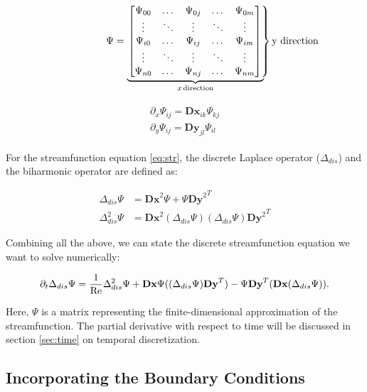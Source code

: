 \begin{align}
\Psi = 
\underbrace{
\left.
\begin{bmatrix}
  \Psi_{00} & \dots  & \Psi_{0j} & \dots  & \Psi_{0m} \\
  \vdots & \ddots & \vdots & \ddots & \vdots \\
  \Psi_{i0} & \dots  & \Psi_{ij} & \dots  & \Psi_{im} \\
  \vdots & \ddots & \vdots & \ddots & \vdots \\
  \Psi_{n0} & \dots  & \Psi_{nj} & \dots  & \Psi_{nm} \\
\end{bmatrix}
\right\} \text{y direction}
\hspace*{-55pt}}_{x \, \text{direction}}
\label{eq:str_matrix}
\end{align}

\begin{align}
  \begin{split}
  \partial_x \Psi_{ij} = \mathbf{Dx}_{ik} \Psi_{kj} \\
  \partial_y \Psi_{ij} = \mathbf{Dy}_{jl} \Psi_{il}
  \end{split}
\label{eq:discr_der}
\end{align}

For the streamfunction equation \eqref{eq:str}, the discrete Laplace operator
($\Delta_{dis}$) and the biharmonic operator are defined as:

\begin{align}
  \Delta_{dis} \Psi &= \mathbf{Dx}^2\Psi + \Psi{\mathbf{Dy}^2}^T \\
  \Delta_{dis}^2 \Psi &= \mathbf{Dx}^2(\Delta_{dis} \Psi) (\Delta_{dis}
    \Psi){\mathbf{Dy}^2}^T 
\end{align}

Combining all the above, we can state the discrete streamfunction equation we
want to solve numerically:

\begin{align}
\partial_t \Delta_{dis} \Psi = \frac{1}{\mathrm{Re}} \Delta_{dis}^2 \Psi
  + \mathbf{Dx}\Psi((\Delta_{dis}\Psi)\mathbf{Dy}^T)
  - \Psi\mathbf{Dy}^T (\mathbf{Dx}(\Delta_{dis} \Psi)). 
\label{eq:str_dis}
\end{align}

Here, $\Psi$ is a matrix representing the finite-dimensional approximation of
the streamfunction. The partial derivative with respect to time will be
discussed in section \ref{sec:time} on temporal discretization.

\subsection{Incorporating the Boundary Conditions} \label{sec:bc}

